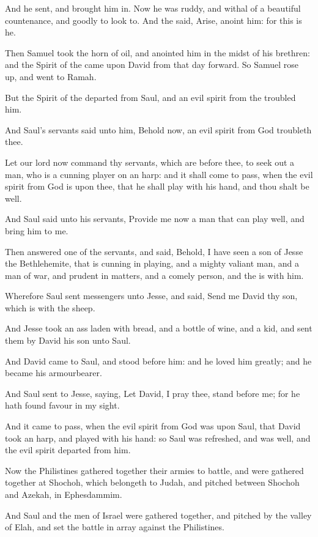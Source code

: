 \Verse And he sent, and brought him in. Now he was ruddy, and withal of a beautiful countenance, and goodly to look to. And the \LORD said, Arise, anoint him: for this is he.

\Verse Then Samuel took the horn of oil, and anointed him in the midst of his brethren: and the Spirit of the \LORD came upon David from that day forward. So Samuel rose up, and went to Ramah.

\Verse But the Spirit of the \LORD departed from Saul, and an evil spirit from the \LORD troubled him.

\Verse And Saul's servants said unto him, Behold now, an evil spirit from God troubleth thee.

\Verse Let our lord now command thy servants, which are before thee, to seek out a man, who is a cunning player on an harp: and it shall come to pass, when the evil spirit from God is upon thee, that he shall play with his hand, and thou shalt be well.

\Verse And Saul said unto his servants, Provide me now a man that can play well, and bring him to me.

\Verse Then answered one of the servants, and said, Behold, I have seen a son of Jesse the Bethlehemite, that is cunning in playing, and a mighty valiant man, and a man of war, and prudent in matters, and a comely person, and the \LORD is with him.

\Verse Wherefore Saul sent messengers unto Jesse, and said, Send me David thy son, which is with the sheep.

\Verse And Jesse took an ass laden with bread, and a bottle of wine, and a kid, and sent them by David his son unto Saul.

\Verse And David came to Saul, and stood before him: and he loved him greatly; and he became his armourbearer.

\Verse And Saul sent to Jesse, saying, Let David, I pray thee, stand before me; for he hath found favour in my sight.

\Verse And it came to pass, when the evil spirit from God was upon Saul, that David took an harp, and played with his hand: so Saul was refreshed, and was well, and the evil spirit departed from him.


\Chapter
\Verse Now the Philistines gathered together their armies to battle, and were gathered together at Shochoh, which belongeth to Judah, and pitched between Shochoh and Azekah, in Ephesdammim.

\Verse And Saul and the men of Israel were gathered together, and pitched by the valley of Elah, and set the battle in array against the Philistines.

